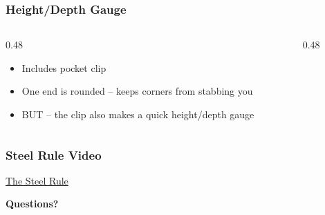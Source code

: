 \begin{frame}
    \frametitle{Height/Depth Gauge}
    \begin{columns}
        \begin{column}{0.48\linewidth}
            \begin{itemize}[<+- | alert@+>]
                \item{Includes pocket clip}
                \item{One end is rounded -- keeps corners from stabbing you}
                \item{BUT -- the clip also makes a quick height/depth gauge}
            \end{itemize}
        \end{column}
        \begin{column}{0.48\linewidth}
        \end{column}        
    \end{columns}
\end{frame}

\begin{frame}
	\frametitle{Steel Rule Video}
    \centering
    \href{https://www.yout-ube.com/watch?v=0KXPuBUdDtw}{The Steel Rule}
\end{frame}

\begin{frame}
    \centering
    {\Huge \textbf{\textcolor{BakerADARed}{Questions?}}}
\end{frame}

